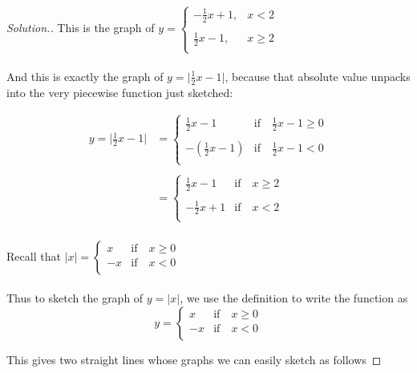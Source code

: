 \documentclass[11pt,a4paper]{article}
\theoremstyle{definition}
\newenvironment{solution}
  {\renewcommand{\qedsymbol}{}\begin{proof}[\textit{Solution}.]}
  {\end{proof}}
\begin{document}
\begin{solution}
This is the graph of $ y=
\begin{cases}
-\frac{1}{2}x+1, & x<2\\\\
\frac{1}{2}x-1, & x\geq 2\\
\end{cases}
$\\\\

And this is exactly the graph of $y=\bigg|\frac{1}{2}x-1\bigg|$, because that
absolute value unpacks into the very piecewise function just sketched:


\begin{align*}
y=\bigg|\frac{1}{2}x-1\bigg| & = 
\begin{cases}
\frac{1}{2}x-1 & \text{if}\quad  \frac{1}{2}x-1\geq 0\\\\
-\left(\frac{1}{2}x-1\right) & \text{if}\quad  \frac{1}{2}x-1<0\\
\end{cases}\\\\
&=
\begin{cases}
\frac{1}{2}x-1 & \text{if}\quad  x\geq 2\\\\
-\frac{1}{2}x+1 & \text{if}\quad  x<2\\
\end{cases}\\
\end{align*}

Recall that $|x|=
\begin{cases}
x & \text{if}\quad  x\geq 0\\
-x & \text{if}\quad  x<0\\
\end{cases}
$\\\\




Thus to sketch the graph of $y=|x|$, we use the definition to write the function as $$y=
\begin{cases}
x & \text{if}\quad  x\geq 0\\
-x & \text{if}\quad  x<0\\
\end{cases}
$$

This gives two straight lines whose graphs we can easily sketch as follows





\end{solution}
\end{document}
